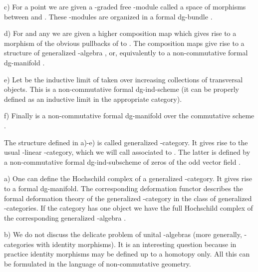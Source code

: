 \documentclass[a4paper,12pt]{article}
\begin{document}
c) For a point  \coordHE{} we are given a \myHighlight{$\Z$}\coordHE{}-graded
free \coordHE{}-module \coordHE{} called a space of morphisms between
\coordHE{} and \coordHE{}. These \coordHE{}-modules are organized in a formal dg-bundle
\coordHE{}.

d) For \coordHE{} and any  \coordHE{} we are given
a higher composition map \coordHE{} which gives rise to a morphism
of the obvious pullbacks of \coordHE{}  to \coordHE{}.
The  composition maps
give rise to a structure of generalized \myHighlight{$\A$}\coordHE{}-algebra \coordHE{},
or, equivalently to a non-commutative formal 
dg-manifold \coordHE{}.


e) Let  \coordHE{} be the inductive limit 
of \coordHE{} taken over increasing collections
of transversal objects. This is a non-commutative formal dg-ind-scheme
(it can be properly defined as an inductive limit in the appropriate
category).

f) Finally  \coordHE{} is a non-commutative formal dg-manifold
over the commutative scheme \coordHE{}. 

The  structure defined in a)-e)  is called generalized
\myHighlight{$\A$}\coordHE{}-category. It gives rise to the usual \coordHE{}-linear
\myHighlight{$\A$}\coordHE{}-category, which we will
call associated to \coordHE{}. The latter is defined by
a non-commutative formal dg-ind-subscheme 
\coordHE{} of zeros
of the odd vector field \coordHE{}.



\begin{rmk} a) One can define the Hochschild complex of
a generalized \myHighlight{$\A$}\coordHE{}-category. It gives rise to a 
formal dg-manifold. 
The corresponding deformation functor describes the formal deformation theory
of the generalized  \myHighlight{$\A$}\coordHE{}-category in the class of generalized \myHighlight{$\A$}\coordHE{}-categories.
If the category has one object \coordHE{} we have 
the full Hochschild complex of the corresponding generalized
\myHighlight{$\A$}\coordHE{}-algebra \coordHE{}.

b) We do not discuss  the delicate problem of unital \myHighlight{$\A$}\coordHE{}-algebras
(more generally, \myHighlight{$\A$}\coordHE{}-categories with identity morphisms). It is an interesting question because
in practice  identity morphisms may be defined  up to a homotopy only.
All this can be formulated in the language of non-commutative geometry.

\end{rmk}
\end{document}
